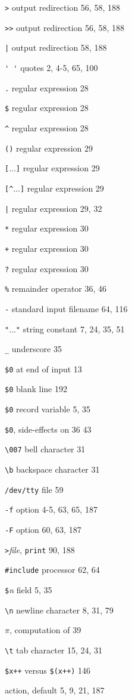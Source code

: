 \begin{multicols}{3}
\verb'>' output redirection 56, 58, 188

\verb'>>' output redirection 56, 58, 188

\verb'|' output redirection 58, 188

\verb"' '" quotes 2, 4-5, 65, 100

\verb'.' regular expression 28

\verb'$' regular expression 28

\verb'^' regular expression 28

\verb'()' regular expression 29

\verb'['...\verb']' regular expression 29

\verb'[^'...\verb']' regular expression 29

\verb'|' regular expression 29, 32

\verb'*' regular expression 30

\verb'+' regular expression 30

\verb'?' regular expression 30

\verb'%' remainder operator 36, 46

\verb'-' standard input filename 64, 116

\verb'"'...\verb'"' string constant 7, 24, 35, 51

\verb'_' underscore 35

\verb'$0' at end of input 13

\verb'$0' blank line 192

\verb'$0' record variable 5, 35

\verb'$0', side-effects on 36 43

\verb'\007' bell character 31

\verb'\b' backspace character 31

\verb'/dev/tty' file 59

\verb'-f' option 4-5, 63, 65, 187

\verb'-F' option 60, 63, 187

\verb'>'\textit{file}, \verb'print' 90, 188

\verb'#include' processor 62, 64

\verb'$'\textit{n} field 5, 35

\verb'\n' newline character 8, 31, 79

$\pi$, computation of 39

\verb'\t' tab character 15, 24, 31

\verb'$x++' versus \verb'$(x++)' 146

action, default 5, 9, 21, 187


\end{multicols}
